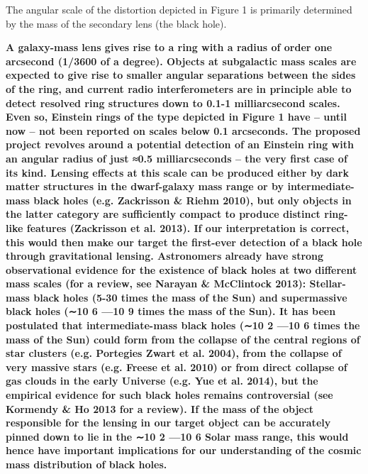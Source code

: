 \documentclass[a4paper, 11pt]{article}
\begin{document}
The angular scale of the distortion depicted in Figure 1 is primarily determined by the mass of the secondary lens (the black hole).

{\bf A galaxy-mass lens gives rise to a ring with a radius of order one arcsecond (1/3600 of a degree). Objects at subgalactic mass scales are expected to give rise to smaller angular separations between the sides of the ring, and current radio interferometers are in principle able to detect resolved ring structures down to 0.1-1 milliarcsecond scales. Even so, Einstein rings of the type depicted in Figure 1 have – until now – not been reported on scales below 0.1 arcseconds. The proposed project revolves around a potential detection of an Einstein ring with an angular radius of just ≈0.5 milliarcseconds – the very first case of its kind. Lensing effects at this scale can be produced either by dark matter structures in the dwarf-galaxy mass range or by intermediate-mass black holes (e.g. Zackrisson \& Riehm 2010), but only objects in the latter category are sufficiently compact to produce distinct ring-like features (Zackrisson et al. 2013). If our interpretation is correct, this would then make our target the first-ever detection of a black hole through gravitational lensing. Astronomers already have strong observational evidence for the existence of black holes at two different mass scales (for a review, see Narayan \& McClintock 2013): Stellar-mass black holes (5-30 times the mass of the Sun) and supermassive black holes (∼10 6 —10 9 times the mass of the Sun). It has been postulated that intermediate-mass black holes (∼10 2 —10 6 times the mass of the Sun) could form from the collapse of the central regions of star clusters (e.g. Portegies Zwart et al. 2004), from the collapse of very massive stars (e.g. Freese et al. 2010) or from direct collapse of gas clouds in the early Universe (e.g. Yue et al. 2014), but the empirical evidence for such black holes remains controversial (see Kormendy \& Ho 2013 for a review). If the mass of the object responsible for the lensing in our target object can be accurately pinned down to lie in the ∼10 2 —10 6 Solar mass range, this would hence have important implications for our understanding of the cosmic mass distribution of black holes.}
\end{document}
